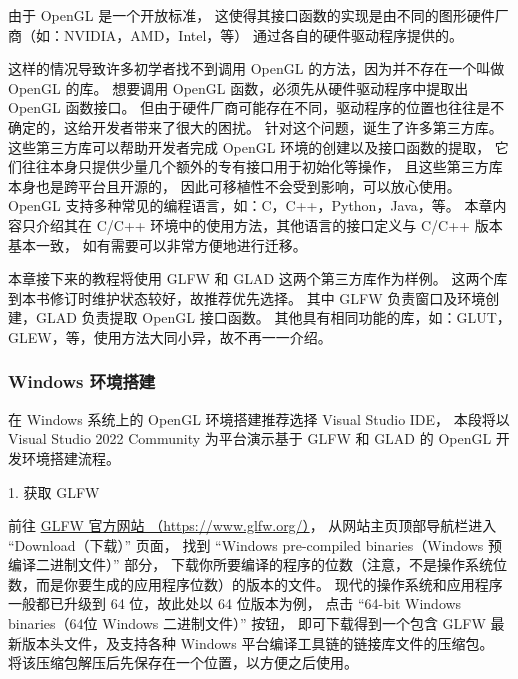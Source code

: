\documentclass[fontset=windows]{ctexart}
\begin{document}
\emph{}

由于 OpenGL 是一个开放标准，
这使得其接口函数的实现是由不同的图形硬件厂商（如：NVIDIA，AMD，Intel，等）
通过各自的硬件驱动程序提供的。

这样的情况导致许多初学者找不到调用 OpenGL 的方法，因为并不存在一个叫做 OpenGL 的库。
想要调用 OpenGL 函数，必须先从硬件驱动程序中提取出 OpenGL 函数接口。
但由于硬件厂商可能存在不同，驱动程序的位置也往往是不确定的，这给开发者带来了很大的困扰。
针对这个问题，诞生了许多第三方库。
这些第三方库可以帮助开发者完成 OpenGL 环境的创建以及接口函数的提取，
它们往往本身只提供少量几个额外的专有接口用于初始化等操作，
且这些第三方库本身也是跨平台且开源的，
因此可移植性不会受到影响，可以放心使用。
OpenGL 支持多种常见的编程语言，如：C，C++，Python，Java，等。
本章内容只介绍其在 C/C++ 环境中的使用方法，其他语言的接口定义与 C/C++ 版本基本一致，
如有需要可以非常方便地进行迁移。

本章接下来的教程将使用 GLFW 和 GLAD 这两个第三方库作为样例。
这两个库到本书修订时维护状态较好，故推荐优先选择。
其中 GLFW 负责窗口及环境创建，GLAD 负责提取 OpenGL 接口函数。
其他具有相同功能的库，如：GLUT，GLEW，等，使用方法大同小异，故不再一一介绍。

\subsubsection{Windows 环境搭建}

\label{sec-gl:build-windows-env}

在 Windows 系统上的 OpenGL 环境搭建推荐选择 Visual Studio IDE，
本段将以 Visual Studio 2022 Community 为平台演示基于 GLFW 和 GLAD 的 OpenGL 开发环境搭建流程。

1. 获取 GLFW

前往 \href{https://www.glfw.org/}{GLFW 官方网站 （https://www.glfw.org/）}，
从网站主页顶部导航栏进入 “Download（下载）” 页面，
找到 “Windows pre-compiled binaries（Windows 预编译二进制文件）” 部分，
下载你所要编译的程序的位数（注意，不是操作系统位数，而是你要生成的应用程序位数）的版本的文件。
现代的操作系统和应用程序一般都已升级到 64 位，故此处以 64 位版本为例，
点击 “64-bit Windows binaries（64位 Windows 二进制文件）” 按钮，
即可下载得到一个包含 GLFW 最新版本头文件，及支持各种 Windows 平台编译工具链的链接库文件的压缩包。
将该压缩包解压后先保存在一个位置，以方便之后使用。
\end{document}
